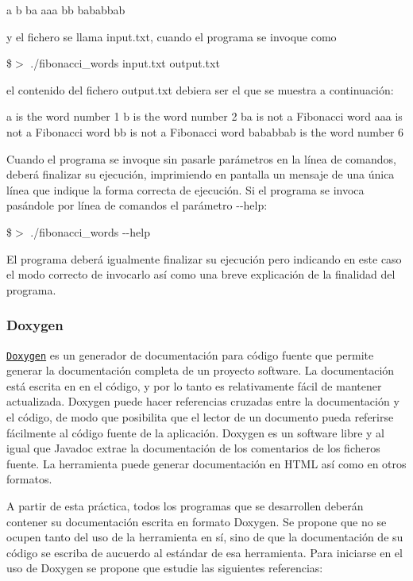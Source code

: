 \begin{DoxyCode}
a
b
ba
aaa
bb
bababbab
\end{DoxyCode}


y el fichero se llama {\ttfamily input.\+txt}, cuando el programa se invoque como

{\ttfamily \$$>$ ./fibonacci\+\_\+words input.\+txt output.\+txt}

el contenido del fichero {\ttfamily output.\+txt} debiera ser el que se muestra a continuación\+:


\begin{DoxyCode}
a is the word number 1
b is the word number 2
ba is not a Fibonacci word
aaa is not a Fibonacci word
bb is not a Fibonacci word
bababbab is the word number 6
\end{DoxyCode}


Cuando el programa se invoque sin pasarle parámetros en la línea de comandos, deberá finalizar su ejecución, imprimiendo en pantalla un mensaje de una única línea que indique la forma correcta de ejecución. Si el programa se invoca pasándole por línea de comandos el parámetro {\ttfamily -\/-\/help}\+:

{\ttfamily \$$>$ ./fibonacci\+\_\+words -\/-\/help}

El programa deberá igualmente finalizar su ejecución pero indicando en este caso el modo correcto de invocarlo así como una breve explicación de la finalidad del programa.

\subsubsection*{Doxygen}

\href{https://www.doxygen.nl/index.html}{\tt Doxygen} es un generador de documentación para código fuente que permite generar la documentación completa de un proyecto software. La documentación está escrita en en el código, y por lo tanto es relativamente fácil de mantener actualizada. Doxygen puede hacer referencias cruzadas entre la documentación y el código, de modo que posibilita que el lector de un documento pueda referirse fácilmente al código fuente de la aplicación. Doxygen es un software libre y al igual que Javadoc extrae la documentación de los comentarios de los ficheros fuente. La herramienta puede generar documentación en H\+T\+ML así como en otros formatos.

A partir de esta práctica, todos los programas que se desarrollen deberán contener su documentación escrita en formato Doxygen. Se propone que no se ocupen tanto del uso de la herramienta en sí, sino de que la documentación de su código se escriba de aucuerdo al estándar de esa herramienta. Para iniciarse en el uso de Doxygen se propone que estudie las siguientes referencias\+:

